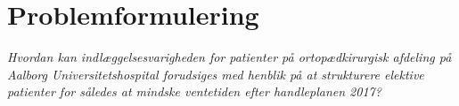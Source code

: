 \section{Problemformulering}
\textit{Hvordan kan indlæggelsesvarigheden for patienter på ortopædkirurgisk afdeling på Aalborg Universitetshospital forudsiges med henblik på at strukturere elektive patienter for således at mindske ventetiden efter handleplanen 2017?}